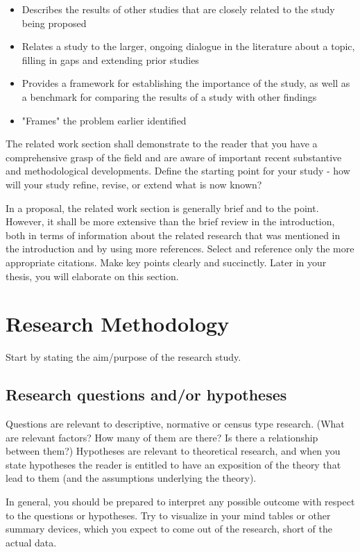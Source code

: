 \documentclass[conference]{IEEEtran}
\begin{document}
\begin{itemize}
\item Describes the results of other studies that are closely related to the study being proposed
\item Relates a study to the larger, ongoing dialogue in the literature about a topic, filling in gaps and extending prior studies
\item Provides a framework for establishing the importance of the study, as well as a benchmark for comparing the results of a study with other findings
\item "Frames" the problem earlier identified
\end{itemize}

The related work section shall demonstrate to the reader that you have a comprehensive grasp of the field and are aware of important recent substantive and methodological developments. Define the starting point for your study - how will your study refine, revise, or extend what is now known?

In a proposal, the related work section is generally brief and to the point. However, it shall be more extensive than the brief review in the introduction, both in terms of information about the related research that was mentioned in the introduction and by using more references. Select and reference only the more appropriate citations. Make key points clearly and succinctly. Later in your thesis, you will elaborate on this section.

\section{Research Methodology}
Start by stating the aim/purpose of the research study.

\subsection{Research questions and/or hypotheses}
Questions are relevant to descriptive, normative or census type research. (What are relevant factors? How many of them are there? Is there a relationship between them?) Hypotheses are relevant to theoretical research, and when you state hypotheses the reader is entitled to have an exposition of the theory that lead to them (and the assumptions underlying the theory).

In general, you should be prepared to interpret any possible outcome with respect to the questions or hypotheses. Try to visualize in your mind tables or other summary devices, which you expect to come out of the research, short of the actual data.
\end{document}
